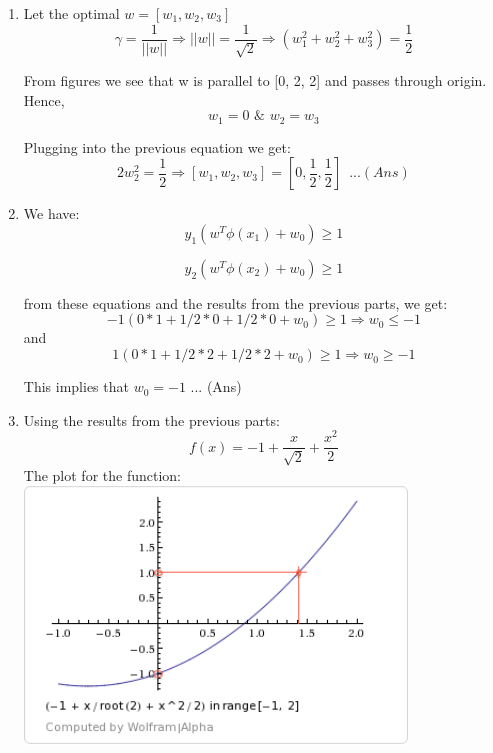 \documentclass[letterpaper]{article}
\begin{document}
\begin{enumerate}
\item 
Let the optimal $w = [w_1, w_2, w_3]$
\begin{equation}
\gamma = \frac{1}{||w||} \Rightarrow ||w|| = \frac{1}{\sqrt{2}} \Rightarrow (w_1^2 + w_2^2 + w_3^2) = \frac{1}{2}
\end{equation}

From figures we see that w is parallel to [0, 2, 2] and passes through origin. Hence,
\begin{equation}
w_1 = 0 \,\, \& \,\,w_2 = w_3
\end{equation}

Plugging into the previous equation we get:
\begin{equation}
2w_2^2 = \frac{1}{2} \Rightarrow  [w_1, w_2, w_3] = [0, \frac{1}{2}, \frac{1}{2}] \,\,\, ...(Ans)
\end{equation}

\item We have:
\begin{equation}
y_1(w^T \phi(x_1) + w_0) \geq 1
\label{eq:condit1}
\end{equation}
\vspace{-1cm}

\begin{equation}
y_2(w^T \phi(x_2) + w_0) \geq 1
\label{eq:condit2}
\end{equation}

from these equations and the results from the previous parts, we get:
\begin{equation}
-1(0*1 + 1/2 * 0 + 1/2 * 0 + w_0) \geq 1 \Rightarrow w_0 \leq -1
\end{equation}
and
\begin{equation}
1(0*1 + 1/2 * 2 + 1/2 * 2 + w_0) \geq 1 \Rightarrow w_0 \geq -1
\end{equation}

This implies that  $w_0 = -1$  ... (Ans)

\item Using the results from the previous parts:
\begin{equation}
f(x) = -1 + \frac{x}{\sqrt{2}} + \frac{x^2}{2}
\end{equation}
The plot for the function:\\
\includegraphics[width = 4in, keepaspectratio]{HW3_q1plot.png}
\end{enumerate}
\end{document}
